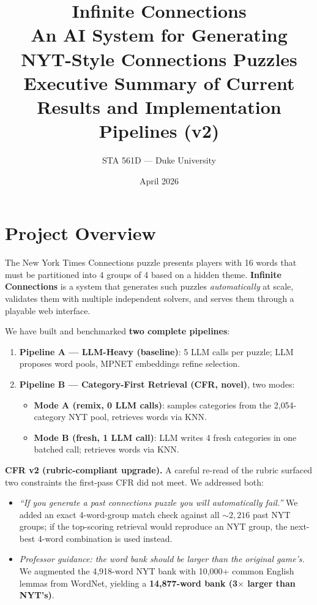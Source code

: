 \documentclass[11pt, letterpaper]{article}
\title{\textbf{Infinite Connections}\\[0.3em]
\large An AI System for Generating NYT-Style Connections Puzzles\\[0.3em]
\normalsize Executive Summary of Current Results and Implementation Pipelines (v2)}
\author{STA 561D --- Duke University}
\date{April 2026}
\begin{document}
\maketitle
\thispagestyle{fancy}

\vspace{-1em}

\section{Project Overview}

The New York Times Connections puzzle presents players with 16 words that must be
partitioned into 4 groups of 4 based on a hidden theme. \textbf{Infinite Connections}
is a system that generates such puzzles \emph{automatically} at scale, validates them
with multiple independent solvers, and serves them through a playable web interface.

We have built and benchmarked \textbf{two complete pipelines}:

\begin{enumerate}[leftmargin=*, itemsep=0.2em]
\item \textbf{Pipeline A --- LLM-Heavy (baseline)}: 5 LLM calls per puzzle; LLM
proposes word pools, MPNET embeddings refine selection.
\item \textbf{Pipeline B --- Category-First Retrieval (CFR, novel)}, two modes:
    \begin{itemize}[itemsep=0.1em]
    \item \textbf{Mode A (remix, 0 LLM calls)}: samples categories from the
    2{,}054-category NYT pool, retrieves words via KNN.
    \item \textbf{Mode B (fresh, 1 LLM call)}: LLM writes 4 fresh categories in one
    batched call; retrieves words via KNN.
    \end{itemize}
\end{enumerate}

\textbf{CFR v2 (rubric-compliant upgrade).} A careful re-read of the rubric surfaced
two constraints the first-pass CFR did not meet. We addressed both:
\begin{itemize}[leftmargin=*, itemsep=0.1em]
\item \emph{``If you generate a past connections puzzle you will automatically fail.''}
We added an exact 4-word-group match check against all ${\sim}2{,}216$ past NYT groups;
if the top-scoring retrieval would reproduce an NYT group, the next-best 4-word
combination is used instead.
\item \emph{Professor guidance: the word bank should be larger than the original
game's.} We augmented the 4{,}918-word NYT bank with 10{,}000+ common English lemmas
from WordNet, yielding a \textbf{14{,}877-word bank (3$\times$ larger than NYT's)}.
\end{itemize}
\end{document}
